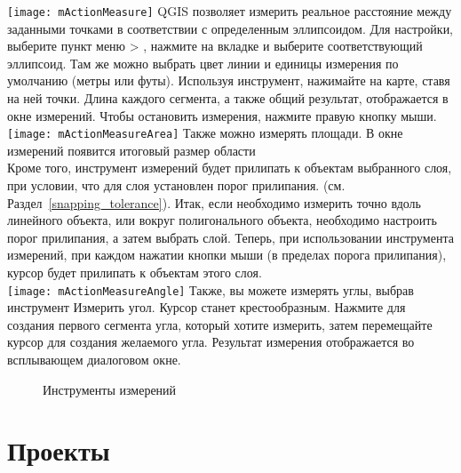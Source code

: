 \texttt{[image: mActionMeasure]}
QGIS позволяет измерить реальное расстояние между заданными точками в соответствии с определенным эллипсоидом. Для настройки, выберите пункт меню  > ,
нажмите на вкладке  и выберите соответствующий эллипсоид. Там же можно выбрать цвет линии и единицы измерения по умолчанию (метры или футы). Используя инструмент, нажимайте на карте, ставя на ней точки. Длина каждого сегмента, а также общий результат, отображается в окне измерений. Чтобы остановить измерения, нажмите правую кнопку мыши. \\
\texttt{[image: mActionMeasureArea]} Также можно измерять площади. В окне измерений появится итоговый размер области  \\
Кроме того, инструмент измерений будет прилипать к объектам выбранного слоя, при условии, что для слоя установлен порог прилипания. (см. Раздел~\ref{snapping_tolerance}). Итак, если необходимо измерить точно вдоль линейного объекта, или вокруг полигонального объекта, необходимо настроить порог прилипания, а затем выбрать слой. Теперь, при использовании инструмента измерений, при каждом нажатии кнопки мыши (в пределах порога прилипания), курсор будет прилипать к объектам этого слоя. \\
\texttt{[image: mActionMeasureAngle]}
Также, вы можете измерять углы, выбрав инструмент Измерить угол. Курсор станет крестообразным. Нажмите для создания первого сегмента угла, который хотите измерить, затем перемещайте курсор для создания желаемого угла. Результат измерения отображается во всплывающем диалоговом окне.

\begin{figure}[ht]
\centering
     \hspace{0.33cm}
     \hspace{0.33cm}
   \caption{Инструменты измерений \nixcaption} \label{fig:measure}
\end{figure}


\section{Проекты}\label{sec:projects}

